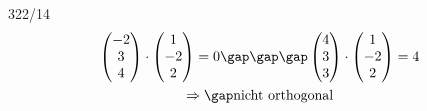 \begin{exercise}{322/14}
\begin{gather*}
    \begin{pmatrix}-2 \\ 3 \\ 4\end{pmatrix} \cdot \begin{pmatrix}1 \\ -2 \\ 2\end{pmatrix} = 0 \gap\gap\gap \begin{pmatrix}4 \\ 3 \\ 3\end{pmatrix} \cdot \begin{pmatrix}1 \\ -2 \\ 2\end{pmatrix} = 4 \\
    \Rightarrow\gap \text{nicht orthogonal}
  \end{gather*}
\end{exercise}
